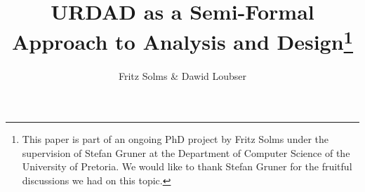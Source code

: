 \documentclass[twocolumn]{svjour3}          %
\usepackage{graphicx}
\usepackage{mathptmx} %
\usepackage{latexsym}


\title{URDAD as a Semi-Formal Approach to Analysis and Design\thanks{This
	paper is part of an ongoing PhD project by Fritz Solms under the supervision
	of Stefan Gruner at the Department of Computer Science of the University of
	Pretoria. We would like to thank Stefan Gruner for the fruitful discussions 
	we had on this topic.}}
	
\author{Fritz Solms \& Dawid Loubser}


